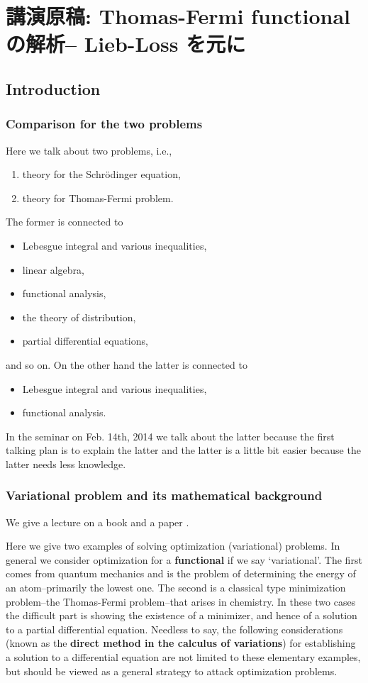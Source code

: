 \documentclass[openany, a4paper, oneside]{jsbook}
\begin{document}
\chapter{講演原稿: Thomas-Fermi functional の解析-- Lieb-Loss \cite{LiebLoss1} を元に}

\section{Introduction}

\subsection{Comparison for the two problems}

Here we talk about two problems, i.e.,
\begin{enumerate}
\item theory for the Schr\"odinger equation,
\item theory for Thomas-Fermi problem.
\end{enumerate}
The former is connected to
\begin{itemize}
\item Lebesgue integral and various inequalities,
\item linear algebra,
\item functional analysis,
\item the theory of distribution,
\item partial differential equations,
\end{itemize}
and so on.
On the other hand the latter is connected to
\begin{itemize}
\item Lebesgue integral and various inequalities,
\item functional analysis.
\end{itemize}
In the seminar on Feb. 14th, 2014  we talk about the latter because
the first talking plan is to explain the latter and the latter is a little bit easier
because the latter needs less knowledge.
\subsection{Variational problem and its mathematical background}

We give a lecture on a book \cite{LiebLoss1} and a paper \cite{LiebSimon1}.

Here we give two examples of solving optimization (variational) problems.
In general we consider optimization for a \textbf{functional} if we say `variational'.
The first comes from quantum mechanics and is the problem of determining the energy of an atom--primarily the lowest one.
The second is a classical type minimization problem--the Thomas-Fermi problem--that arises in chemistry.
In these two cases the difficult part is showing the existence of a minimizer, and hence of a solution
to a partial differential equation.
Needless to say, the following considerations (known as the \textbf{direct method in the calculus of variations})
for establishing a solution to a differential equation are not limited to these elementary examples,
but should be viewed as a general strategy to attack optimization problems.
\end{document}
